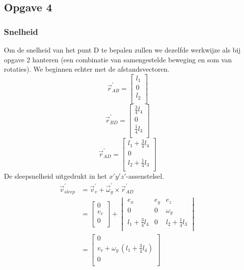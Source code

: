 \subsection{Opgave 4}
\subsubsection{Snelheid}
Om de snelheid van het punt D te bepalen zullen we dezelfde werkwijze als bij opgave 2 hanteren (een combinatie van samengestelde beweging en som van rotaties). We beginnen echter met de afstandsvectoren.
\begin{equation}
\vec{r}_{AB}^{'}=
\begin{bmatrix}
l_{1}\\
0\\
l_{2}\\
\end{bmatrix}
\label{eq:kin4.1}
\end{equation}
\begin{equation}
\vec{r}_{BD}^{'}=
\begin{bmatrix}
\frac{3}{4} l_{4}\\
0\\
\frac{1}{4}l_{3}\\
\end{bmatrix}
\label{eq:kin4.2}
\end{equation}
\begin{equation}
\vec{r}_{AD}^{'}=
\begin{bmatrix}
l_{1}+\frac{3}{4}l_{4}\\
0\\
l_{2}+\frac{1}{4}l_{3}\\
\end{bmatrix}
\label{eq:kin4.3}
\end{equation}
De sleepsnelheid uitgedrukt in het $x'y'z'$-assenstelsel.
\begin{equation}
\begin{split}
\vec{v}_{sleep}^{'}&=\vec{v}_{v}^{'}+\vec{\omega}_{g}^{'}\times\vec{r}_{AD}^{'}\\
&=\begin{bmatrix}
0						\\
v_{v}	\\
0						\\
\end{bmatrix}
+\begin{vmatrix}
e_{x}&e_{y}&e_{z}\\
0&0&\omega_{g}\\
l_{1}+\frac{3}{4}l_{4}&0&l_{2}+\frac{1}{4}l_{3}\\
\end{vmatrix}\\
&=\begin{bmatrix}
0						\\
v_{v}+\omega_{g}\,\left( l_{1}+\frac{3}{4} l_{4}\right)\\
0						\\
\end{bmatrix}
\end{split}
\label{eq:kin4.4}
\end{equation}
